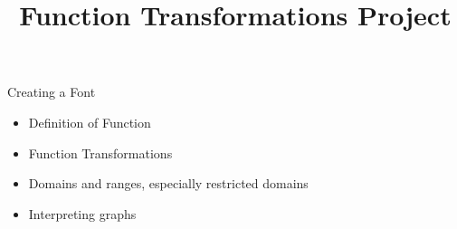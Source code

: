 \documentclass{ximera}
\author{}
\title{Function Transformations Project}
\begin{document}
\begin{abstract}
\end{abstract}
\maketitle


\begin{objectives}

\item Creating a Font
\begin{itemize}
	\item Definition of Function
	\item Function Transformations
	\item Domains and ranges, especially restricted domains
	\item Interpreting graphs
\end{itemize}



\end{objectives}
\end{document}
